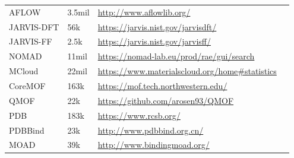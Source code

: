 \documentclass[pdflatex,sn-mathphys]{sn-jnl}%
\theoremstyle{thmstyleone}%
\theoremstyle{thmstyletwo}%
\theoremstyle{thmstylethree}%
\begin{document}
\begin{table}[hbt!]
\begin{minipage}{174pt}
\begin{tabular}{@{}llll@{}}
AFLOW   &  3.5mil & \url{http://www.aflowlib.org/}   & \cite{curtarolo2012aflow}  \\
JARVIS-DFT   &  56k & \url{https://jarvis.nist.gov/jarvisdft/}   & \cite{choudhary2020joint}  \\
JARVIS-FF   &  2.5k & \url{https://jarvis.nist.gov/jarvisff/}   & \cite{choudhary2020joint}  \\
NOMAD   &  11mil & \url{https://nomad-lab.eu/prod/rae/gui/search}   & \cite{draxl2018nomad}  \\
MCloud   &  22mil & \url{https://www.materialscloud.org/home#statistics}   & \cite{talirz2020materials}  \\
CoreMOF   &  163k   & \url{https://mof.tech.northwestern.edu/} & \cite{chung2019advances}  \\
QMOF   & 22k &  \url{https://github.com/arosen93/QMOF}   & \cite{rosen2021machine}  \\
PDB  & 183k &  \url{https://www.rcsb.org/}   & \cite{sussman1998protein}  \\
PDBBind  & 23k &  \url{http://www.pdbbind.org.cn/}   & \cite{wang2005pdbbind}  \\
MOAD   &  39k & \url{http://www.bindingmoad.org/}   & \cite{benson2007binding}  \\


\end{tabular}
\end{minipage}
\end{table}
\end{document}
